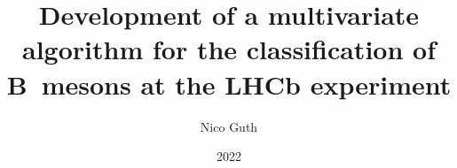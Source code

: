 \documentclass[
  tucolor,       %
  BCOR=12mm,     %
  parskip=half,  %
  open=any,      %
  cleardoublepage=plain,  %
]{tudothesis}
\author{Nico Guth}
\title{Development of a multivariate algorithm for the classification of B~mesons at the LHCb experiment}
\date{2022}
\begin{document}
\frontmatter
\maketitle

\makecorrectorpage


\tableofcontents

\mainmatter %






%

\backmatter
\printbibliography


\cleardoublepage


\end{document}
